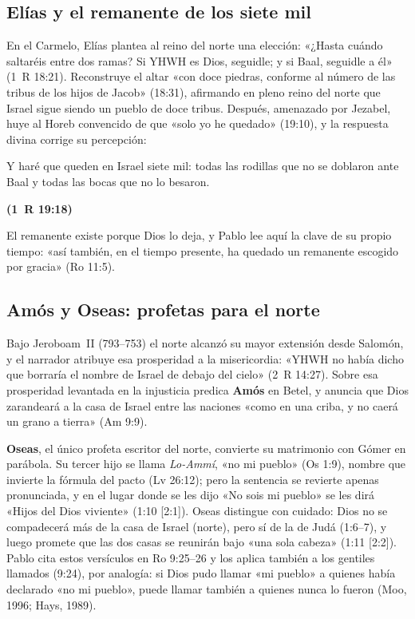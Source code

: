 \documentclass[11pt,letterpaper]{article}
\newcommand{\fuente}[1]{\par\hfill{\upshape\bfseries\small\textcolor{ladrillo}{#1}}}
\begin{document}
\subsection{Elías y el remanente de los siete mil}
En el Carmelo, Elías plantea al reino del norte una elección: «¿Hasta cuándo saltaréis entre dos ramas? Si YHWH es Dios, seguidle; y si Baal, seguidle a él» (1~R 18:21). Reconstruye el altar «con doce piedras, conforme al número de las tribus de los hijos de Jacob» (18:31), afirmando en pleno reino del norte que Israel sigue siendo un pueblo de doce tribus. Después, amenazado por Jezabel, huye al Horeb convencido de que «solo yo he quedado» (19:10), y la respuesta divina corrige su percepción:
\begin{cita}Y haré que queden en Israel siete mil: todas las rodillas que no se doblaron ante Baal y todas las bocas que no lo besaron.\fuente{(1~R 19:18)}\end{cita}
El remanente existe porque Dios lo deja, y Pablo lee aquí la clave de su propio tiempo: «así también, en el tiempo presente, ha quedado un remanente escogido por gracia» (Ro 11:5).

\subsection{Amós y Oseas: profetas para el norte}
Bajo Jeroboam~II (793--753) el norte alcanzó su mayor extensión desde Salomón, y el narrador atribuye esa prosperidad a la misericordia: «YHWH no había dicho que borraría el nombre de Israel de debajo del cielo» (2~R 14:27). Sobre esa prosperidad levantada en la injusticia predica \textbf{Amós} en Betel, y anuncia que Dios zarandeará a la casa de Israel entre las naciones «como en una criba, y no caerá un grano a tierra» (Am 9:9).

\textbf{Oseas}, el único profeta escritor del norte, convierte su matrimonio con Gómer en parábola. Su tercer hijo se llama \emph{Lo-Ammí}, «no mi pueblo» (Os 1:9), nombre que invierte la fórmula del pacto (Lv 26:12); pero la sentencia se revierte apenas pronunciada, y en el lugar donde se les dijo «No sois mi pueblo» se les dirá «Hijos del Dios viviente» (1:10 [2:1]). Oseas distingue con cuidado: Dios no se compadecerá más de la casa de Israel (norte), pero sí de la de Judá (1:6--7), y luego promete que las dos casas se reunirán bajo «una sola cabeza» (1:11 [2:2]). Pablo cita estos versículos en Ro 9:25--26 y los aplica también a los gentiles llamados (9:24), por analogía: si Dios pudo llamar «mi pueblo» a quienes había declarado «no mi pueblo», puede llamar también a quienes nunca lo fueron (Moo, 1996; Hays, 1989).
\end{document}
